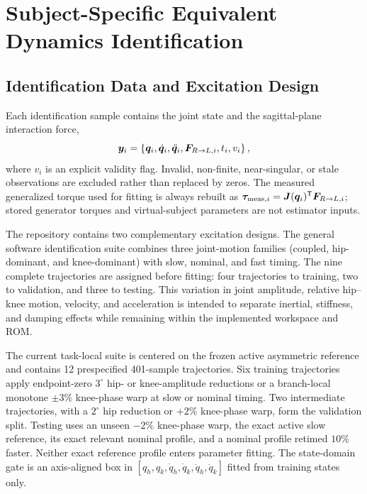 \section{Subject-Specific Equivalent Dynamics Identification}
\label{sec:identification}

\subsection{Identification Data and Excitation Design}
\label{subsec:identification_data}

Each identification sample contains the joint state and the sagittal-plane
interaction force,
\begin{equation}
    \bm{y}_i=
    \left\{\bm{q}_i,\dot{\bm{q}}_i,\ddot{\bm{q}}_i,
    \bm{F}_{R\rightarrow L,i},t_i,v_i\right\},
    \label{eq:identification_signals}
\end{equation}
where $v_i$ is an explicit validity flag.  Invalid, non-finite,
near-singular, or stale observations are excluded rather than replaced by
zeros.  The measured generalized torque used for fitting is always rebuilt as
$\bm{\tau}_{\mathrm{meas},i}=\bm{J}(\bm{q}_i)^{\mathsf T}
\bm{F}_{R\rightarrow L,i}$; stored generator torques and virtual-subject
parameters are not estimator inputs.

The repository contains two complementary excitation designs.  The general
software identification suite combines three joint-motion families
(coupled, hip-dominant, and knee-dominant) with slow, nominal, and fast timing.
The nine complete trajectories are assigned before fitting: four trajectories
to training, two to validation, and three to testing.  This variation in joint
amplitude, relative hip--knee motion, velocity, and acceleration is intended to
separate inertial, stiffness, and damping effects while remaining within the
implemented workspace and ROM.

The current task-local suite is centered on the frozen active asymmetric
reference and contains 12 prespecified 401-sample trajectories.  Six training
trajectories apply endpoint-zero $3^{\circ}$ hip- or knee-amplitude reductions
or a branch-local monotone $\pm3\%$ knee-phase warp at slow or nominal timing.
Two intermediate trajectories, with a $2^{\circ}$ hip reduction or $+2\%$
knee-phase warp, form the validation split.  Testing uses an unseen $-2\%$
knee-phase warp, the exact active slow reference, its exact relevant nominal
profile, and a nominal profile retimed $10\%$ faster.  Neither exact reference
profile enters parameter fitting.  The state-domain gate is an axis-aligned
box in $[q_h,q_k,\dot q_h,\dot q_k,\ddot q_h,\ddot q_k]$ fitted from training
states only.

